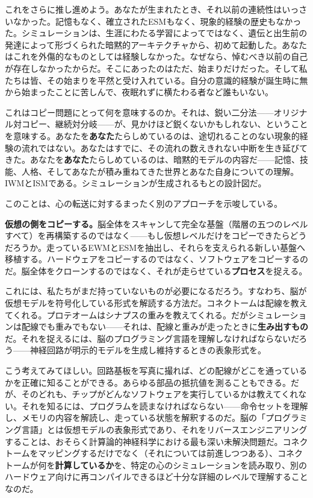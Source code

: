 \documentclass[11pt, twoside, openright]{book}
\begin{document}
これをさらに推し進めよう。あなたが生まれたとき、それ以前の連続性はいっさいなかった。記憶もなく、確立されたESMもなく、現象的経験の歴史もなかった。シミュレーションは、生涯にわたる学習によってではなく、遺伝と出生前の発達によって形づくられた暗黙的アーキテクチャから、初めて起動した。あなたはこれを外傷的なものとしては経験しなかった。なぜなら、悼むべき以前の自己が存在しなかったからだ。そこにあったのはただ、始まりだけだった。そして私たちは皆、その始まりを平然と受け入れている。自分の意識的経験が誕生時に無から始まったことに苦しんで、夜眠れずに横たわる者など誰もいない。

これはコピー問題にとって何を意味するのか。それは、鋭い二分法------オリジナル対コピー、継続対分岐------が、見かけほど鋭くないかもしれない、ということを意味する。あなたを\textbf{あなた}たらしめているのは、途切れることのない現象的経験の流れではない。あなたはすでに、その流れの数えきれない中断を生き延びてきた。あなたを\textbf{あなた}たらしめているのは、暗黙的モデルの内容だ------記憶、技能、人格、そしてあなたが積み重ねてきた世界とあなた自身についての理解。IWMとISMである。シミュレーションが生成されるもとの設計図だ。

このことは、心の転送に対するまったく別のアプローチを示唆している。

\textbf{仮想の側をコピーする。}脳全体をスキャンして完全な基盤（階層の五つのレベルすべて）を再構築するのではなく------もし仮想レベルだけをコピーできたらどうだろうか。走っているEWMとESMを抽出し、それらを支えられる新しい基盤へ移植する。ハードウェアをコピーするのではなく、ソフトウェアをコピーするのだ。脳全体をクローンするのではなく、それが走らせている\textbf{プロセス}を捉える。

これには、私たちがまだ持っていないものが必要になるだろう。すなわち、脳が仮想モデルを符号化している形式を解読する方法だ。コネクトームは配線を教えてくれる。プロテオームはシナプスの重みを教えてくれる。だがシミュレーションは配線でも重みでもない------それは、配線と重みが走ったときに\textbf{生み出すもの}だ。それを捉えるには、脳のプログラミング言語を理解しなければならないだろう------神経回路が明示的モデルを生成し維持するときの表象形式を。

こう考えてみてほしい。回路基板を写真に撮れば、どの配線がどこを通っているかを正確に知ることができる。あらゆる部品の抵抗値を測ることもできる。だが、そのどれも、チップがどんなソフトウェアを実行しているかは教えてくれない。それを知るには、プログラムを読まなければならない------命令セットを理解し、メモリの内容を解読し、走っている状態を解釈するのだ。脳の「プログラミング言語」とは仮想モデルの表象形式であり、それをリバースエンジニアリングすることは、おそらく計算論的神経科学における最も深い未解決問題だ。コネクトームをマッピングするだけでなく（それについては前進しつつある）、コネクトームが何を\textbf{計算しているか}を、特定の心のシミュレーションを読み取り、別のハードウェア向けに再コンパイルできるほど十分な詳細のレベルで理解することなのだ。
\end{document}
